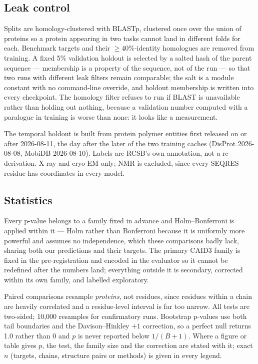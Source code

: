 \subsection*{Leak control}

Splits are homology-clustered with BLASTp, clustered once over the union of
proteins so a protein appearing in two tasks cannot land in different folds for
each. Benchmark targets and their $\ge 40\%$-identity homologues are removed
from training. A fixed 5\% validation holdout is selected by a salted hash of the
parent sequence --- membership is a property of the sequence, not of the run ---
so that two runs with different leak filters remain comparable; the salt is a
module constant with no command-line override, and holdout membership is written
into every checkpoint. The homology filter refuses to run if BLAST is
unavailable rather than holding out nothing, because a validation number
computed with a paralogue in training is worse than none: it looks like a
measurement.

The temporal holdout is built from protein polymer entities first released on or
after 2026-08-11, the day after the later of the two training caches (DisProt
2026-08-08, MobiDB 2026-08-10). Labels are RCSB's own
 annotation, not a re-derivation. X-ray and
cryo-EM only; NMR is excluded, since every SEQRES residue has coordinates in
every model.

\subsection*{Statistics}

Every p-value belongs to a family fixed in advance and Holm--Bonferroni\cite{holm}
is applied within it --- Holm rather than Bonferroni because it is uniformly more
powerful and assumes no independence, which these comparisons badly lack, sharing
both our predictions and their targets. The primary CAID3 family is fixed in the
pre-registration and encoded in the evaluator so it cannot be redefined after the
numbers land; everything outside it is secondary, corrected within its own
family, and labelled exploratory.

Paired comparisons resample \emph{proteins}, not residues, since residues within
a chain are heavily correlated and a residue-level interval is far too narrow.
All tests are two-sided; 10{,}000 resamples for confirmatory runs. Bootstrap
p-values use both tail boundaries and the Davison--Hinkley $+1$
correction\cite{davison}, so a perfect null returns 1.0 rather than 0 and $p$ is
never reported below $1/(B{+}1)$. Where a figure or table gives $p$, the test,
the family size and the correction are stated with it; exact $n$ (targets,
chains, structure pairs or methods) is given in every legend.


